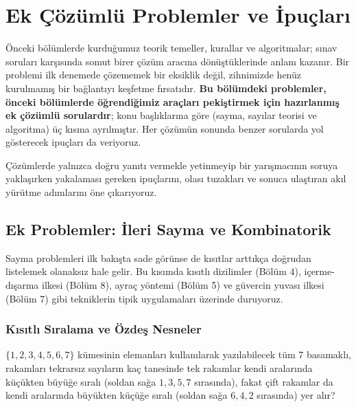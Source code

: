 \chapter{Ek Çözümlü Problemler ve İpuçları}

Önceki bölümlerde kurduğumuz teorik temeller, kurallar ve algoritmalar; sınav soruları karşısında somut birer çözüm aracına dönüştüklerinde anlam kazanır. Bir problemi ilk denemede çözememek bir eksiklik değil, zihnimizde henüz kurulmamış bir bağlantıyı keşfetme fırsatıdır. \textbf{Bu bölümdeki problemler, önceki bölümlerde öğrendiğimiz araçları pekiştirmek için hazırlanmış ek çözümlü sorulardır}; konu başlıklarına göre (sayma, sayılar teorisi ve algoritma) üç kısma ayrılmıştır. Her çözümün sonunda benzer sorularda yol gösterecek ipuçları da veriyoruz.

Çözümlerde yalnızca doğru yanıtı vermekle yetinmeyip bir yarışmacının soruya yaklaşırken yakalaması gereken ipuçlarını, olası tuzakları ve sonuca ulaştıran akıl yürütme adımlarını öne çıkarıyoruz.

\section{Ek Problemler: İleri Sayma ve Kombinatorik}

Sayma problemleri ilk bakışta sade görünse de kısıtlar arttıkça doğrudan listelemek olanaksız hale gelir. Bu kısımda kısıtlı dizilimler (Bölüm 4), içerme-dışarma ilkesi (Bölüm 8), ayraç yöntemi (Bölüm 5) ve güvercin yuvası ilkesi (Bölüm 7) gibi tekniklerin tipik uygulamaları üzerinde duruyoruz.

\subsection{Kısıtlı Sıralama ve Özdeş Nesneler}

\begin{example}
$\{1, 2, 3, 4, 5, 6, 7\}$ kümesinin elemanları kullanılarak yazılabilecek tüm 7 basamaklı, rakamları tekrarsız sayıların kaç tanesinde tek rakamlar kendi aralarında küçükten büyüğe sıralı (soldan sağa $1, 3, 5, 7$ sırasında), fakat çift rakamlar da kendi aralarında büyükten küçüğe sıralı (soldan sağa $6, 4, 2$ sırasında) yer alır?
\end{example}

